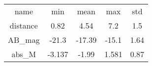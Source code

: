 \begin{table}
\begin{tabular}{ccccc}
name & min & mean & max & std \\
distance & 0.82 & 4.54 & 7.2 & 1.5 \\
AB_mag & -21.3 & -17.39 & -15.1 & 1.64 \\
abs_M & -3.137 & -1.99 & 1.581 & 0.87 \\
\end{tabular}
\end{table}

